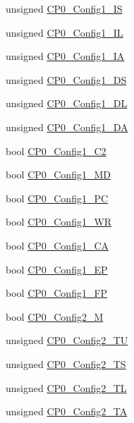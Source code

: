 \begin{DoxyCompactItemize}
unsigned \hyperlink{structMipsISA_1_1CoreSpecific_aab524d52244799a851943e0c90736a9b}{CP0\_\-Config1\_\-IS}
\item 
unsigned \hyperlink{structMipsISA_1_1CoreSpecific_a681e7511230e6dd20cbf3c9ff5db3b29}{CP0\_\-Config1\_\-IL}
\item 
unsigned \hyperlink{structMipsISA_1_1CoreSpecific_a3cb5741e7725c71908e44e3d5c48430f}{CP0\_\-Config1\_\-IA}
\item 
unsigned \hyperlink{structMipsISA_1_1CoreSpecific_ae315fbc0a36129f8160c07df453677c9}{CP0\_\-Config1\_\-DS}
\item 
unsigned \hyperlink{structMipsISA_1_1CoreSpecific_a022a085da7da247b4a15fc55caa31a56}{CP0\_\-Config1\_\-DL}
\item 
unsigned \hyperlink{structMipsISA_1_1CoreSpecific_abcb36837256257819e40d5357f4678bd}{CP0\_\-Config1\_\-DA}
\item 
bool \hyperlink{structMipsISA_1_1CoreSpecific_a2c1d011afea1055672f3be8708e668f1}{CP0\_\-Config1\_\-C2}
\item 
bool \hyperlink{structMipsISA_1_1CoreSpecific_a723779a3ca7388d35b9dcf3b9ef036e3}{CP0\_\-Config1\_\-MD}
\item 
bool \hyperlink{structMipsISA_1_1CoreSpecific_a14c6693648a9f4802197c9db512d80b4}{CP0\_\-Config1\_\-PC}
\item 
bool \hyperlink{structMipsISA_1_1CoreSpecific_ae2010b6a32ae22732815621321cffcd2}{CP0\_\-Config1\_\-WR}
\item 
bool \hyperlink{structMipsISA_1_1CoreSpecific_afe646ac875e12f23fa27b5f3bee0384e}{CP0\_\-Config1\_\-CA}
\item 
bool \hyperlink{structMipsISA_1_1CoreSpecific_a1fec69d38754d6662dead24f0016789a}{CP0\_\-Config1\_\-EP}
\item 
bool \hyperlink{structMipsISA_1_1CoreSpecific_a8b49166e1dd334fef6092ac32e136c87}{CP0\_\-Config1\_\-FP}
\item 
bool \hyperlink{structMipsISA_1_1CoreSpecific_af18510126aeae897d06d3832a3e26419}{CP0\_\-Config2\_\-M}
\item 
unsigned \hyperlink{structMipsISA_1_1CoreSpecific_a464efdc1fcd66055f5f39926f8149261}{CP0\_\-Config2\_\-TU}
\item 
unsigned \hyperlink{structMipsISA_1_1CoreSpecific_a9beb7688bc9ee4545285b09f767f3a12}{CP0\_\-Config2\_\-TS}
\item 
unsigned \hyperlink{structMipsISA_1_1CoreSpecific_ae8a5f44d7f1e73327fb24f8c63785588}{CP0\_\-Config2\_\-TL}
\item 
unsigned \hyperlink{structMipsISA_1_1CoreSpecific_a9d1a7d14c82121bb2899c3207872516c}{CP0\_\-Config2\_\-TA}

\end{DoxyCompactItemize}
